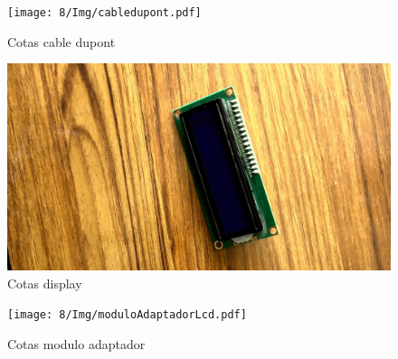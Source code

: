     
    \begin{figure}[H]
        \centering
        \texttt{[image: 8/Img/cabledupont.pdf]}
        \caption{Cotas cable dupont}
        \label{Cotas Cable dupont}
    \end{figure}
    
    
    
    \begin{figure}[H]
        \centering
        \includegraphics[trim = {1mm 1mm 1mm 1mm},clip,scale=0.3]{8/Img/display.pdf}
        \caption{Cotas display}
        \label{Cotas display}
    \end{figure}
    
    
    \begin{figure}[H]
        \centering
        \texttt{[image: 8/Img/moduloAdaptadorLcd.pdf]}
        \caption{Cotas modulo adaptador}
        \label{Cotas modulo adapatdor}
    \end{figure}
    
